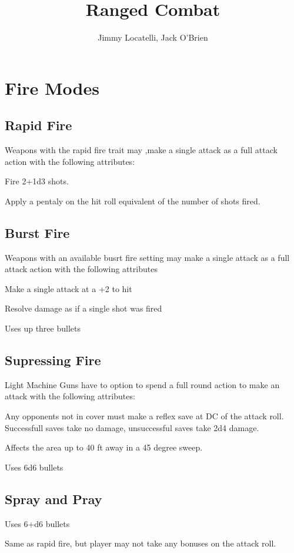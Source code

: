 \documentclass[12pt]{article}
\begin{document}
\title{Ranged Combat}
\author{Jimmy Locatelli, Jack O'Brien}
\maketitle

\section{Fire Modes}

\subsection{Rapid Fire}

Weapons with the rapid fire trait may ,make a single attack as a full attack action with the following attributes:

Fire 2+1d3 shots.

Apply a pentaly on the hit roll equivalent of the number of shots fired.

\subsection{Burst Fire}

Weapons with an available busrt fire setting may make a single attack as a full attack action with the following attributes

Make a single attack at a +2 to hit

Resolve damage as if a single shot was fired

Uses up three bullets

\subsection{Supressing Fire}

Light Machine Guns have to option to spend a full round action to make an attack with the following attributes:

Any opponents not in cover must make a reflex save at DC of the attack roll.  Successfull saves take no damage, unsuccessful saves take 2d4 damage.

Affects the area up to 40 ft away in a 45 degree sweep.

Uses 6d6 bullets

\subsection{Spray and Pray}

Uses 6+d6 bullets

Same as rapid fire, but player may not take any bonuses on the attack roll.
\end{document}
